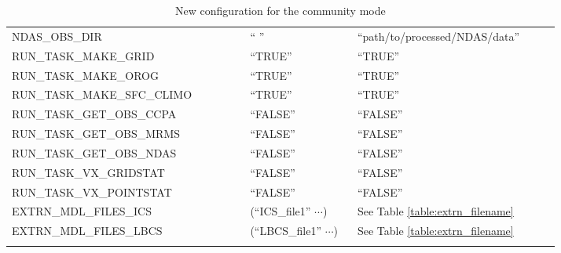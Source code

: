 \documentclass[11pt,fleqn]{report}              %
\begin{document}
\begin{enumerate}
{\begin{longtable}{p{0.4\linewidth} | p{0.18\linewidth} | p{0.34\linewidth} }
 NDAS\_OBS\_DIR & `` '' & ``path/to/processed/NDAS/data'' \\ 
 RUN\_TASK\_MAKE\_GRID & ``TRUE'' & ``TRUE'' \\
 RUN\_TASK\_MAKE\_OROG & ``TRUE'' & ``TRUE'' \\
 RUN\_TASK\_MAKE\_SFC\_CLIMO & ``TRUE'' & ``TRUE'' \\
 RUN\_TASK\_GET\_OBS\_CCPA & ``FALSE'' & ``FALSE'' \\
 RUN\_TASK\_GET\_OBS\_MRMS & ``FALSE'' & ``FALSE'' \\
 RUN\_TASK\_GET\_OBS\_NDAS & ``FALSE'' & ``FALSE'' \\
 RUN\_TASK\_VX\_GRIDSTAT & ``FALSE'' & ``FALSE'' \\
 RUN\_TASK\_VX\_POINTSTAT & ``FALSE'' & ``FALSE'' \\
 EXTRN\_MDL\_FILES\_ICS & (``ICS\_file1'' $\cdots$) & See Table \ref{table:extrn_filename} \\
 EXTRN\_MDL\_FILES\_LBCS & (``LBCS\_file1'' $\cdots$) & See Table \ref{table:extrn_filename} \\
\hline
\caption{New configuration for the community mode}
\label{table:config_new_community}
\end{longtable}
}



\end{enumerate}
\end{document}
